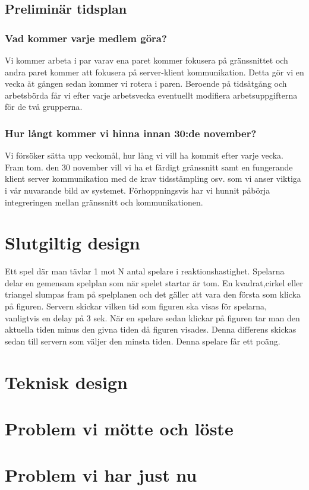 \documentclass[a4paper]{article}
\begin{document}
\subsection{Preliminär tidsplan}
\subsubsection{Vad kommer varje medlem göra?}
Vi kommer arbeta i par varav ena paret kommer fokusera på gränssnittet och andra paret kommer att fokusera på server-klient kommunikation. Detta gör vi en vecka åt gången sedan kommer vi rotera i paren. Beroende på tidsåtgång och arbetsbörda får vi efter varje arbetsvecka eventuellt modifiera arbetsuppgifterna för de två grupperna.
\subsubsection{Hur långt kommer vi hinna innan 30:de november?}
Vi försöker sätta upp veckomål, hur lång vi vill ha kommit efter varje vecka. Fram tom. den 30 november vill vi ha et färdigt gränssnitt samt en fungerande klient server kommunikation med de krav tidsstämpling osv. som vi anser viktiga i vår nuvarande bild av systemet. Förhoppningsvis har vi hunnit påbörja integreringen mellan gränssnitt och kommunikationen.

\newpage
\section{Slutgiltig design}
Ett spel där man tävlar 1 mot N antal spelare i reaktionshastighet. Spelarna delar en gemensam spelplan som när spelet startar är tom. En kvadrat,cirkel eller triangel slumpas fram på spelplanen och det gäller att vara den första som klicka på figuren. Servern skickar vilken tid som figuren ska visas för spelarna, vanligtvis en delay på 3 sek. När en spelare sedan klickar på figuren tar man den aktuella tiden minus den givna tiden då figuren visades. Denna differens skickas sedan till servern som väljer den minsta tiden. Denna spelare får ett poäng.

\section{Teknisk design}

\section{Problem vi mötte och löste}

\section{Problem vi har just nu}
\end{document}
